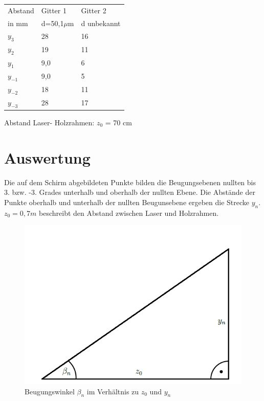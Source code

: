 \documentclass[12pt,a4paper,titlepage,headinclude,bibtotoc]{scrartcl}
\begin{document}
\begin{table} [h!]
\centering
\begin{large}

\end{large}
\begin{tabular}{|p{4 cm}||p{4 cm}|p{4 cm}|}
        \hline
          Abstand  & Gitter 1  & Gitter 2 \\
          in mm & d=50,1$\mu$m & d unbekannt\\
         \hline 
         $y_3 $& 28 & 16 \\
         \hline
         $y_2 $& 19 & 11\\
         \hline
         $y_{1} $& 9,0 & 6 \\
         \hline
         $y_{-1}$& 9,0 & 5 \\
         \hline
         $y_{-2}$& 18 & 11 \\
         \hline             
         $y_{-3}$& 28 & 17 \\
         \hline
\end{tabular}
\end{table}



Abstand Laser- Holzrahmen: $z_0$ = 70 cm



\section{Auswertung}

Die auf dem Schirm abgebildeten Punkte bilden die Beugungsebenen nullten bis 3. bzw. -3. Grades unterhalb und oberhalb der nullten Ebene. Die Abstände der Punkte oberhalb und unterhalb der nullten Beugunsebene ergeben die Strecke $y_n$. $z_0= 0,7 m$ beschreibt den Abstand zwischen Laser und Holzrahmen. 

\begin{figure} [h]
\begin{center}
\includegraphics[scale=0.4]{Dreieck.png} \end{center}
\caption{Beugungswinkel $\beta_n$ im Verhältnis zu $z_0$ und $y_n$}
\end{figure}
\end{document}

